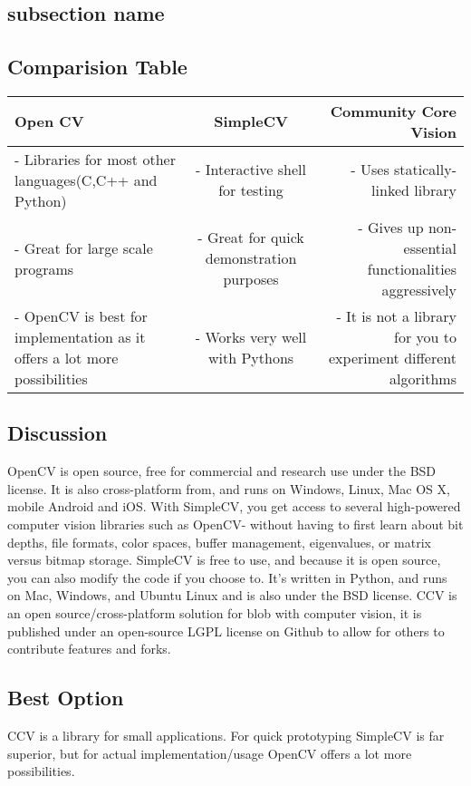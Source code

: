 \documentclass{scrreprt}
\begin{document}
\subsection{subsection name}

\subsection{Comparision Table}
\begin{center}
  \begin{tabular}{| l | c | r |}
    \hline
    Open CV & SimpleCV & Community Core Vision \\ \hline
    \parbox{5cm}{- Libraries for most other languages(C,C++ and Python)} & \parbox{5cm}{- Interactive shell for testing} & \parbox{5cm}{- Uses statically-linked library} \\
    \parbox{5cm}{- Great for large scale programs} & \parbox{5cm}{- Great for quick demonstration purposes} & \parbox{5cm}{- Gives up non-essential functionalities aggressively} \\
    \parbox{5cm}{- OpenCV is best for implementation as it offers a lot more possibilities} & \parbox{5cm}{- Works very well with Pythons} & \parbox{5cm}{- It is not a library for you to experiment different algorithms} \\
    \hline
  \end{tabular}
\end{center}

\subsection{Discussion}
OpenCV is open source, free for commercial and research use under the BSD license.
It is also cross-platform from, and runs on Windows, Linux, Mac OS X, mobile Android and iOS. With SimpleCV, you get access to several high-powered computer vision libraries such as OpenCV- without having to first learn about bit depths, file formats, color spaces, buffer management, eigenvalues, or matrix versus bitmap storage.
SimpleCV is free to use, and because it is open source, you can also modify the code if you choose to.
It’s written in Python, and runs on Mac, Windows, and Ubuntu Linux and is also under the BSD license.
CCV is an open source/cross-platform solution for blob with computer vision,
it is published under an open-source LGPL license on Github to allow for others to contribute features and forks.


\subsection{Best Option}
CCV is a library for small applications.
For quick prototyping SimpleCV is far superior, but for actual implementation/usage OpenCV offers a lot more possibilities.
\end{document}
